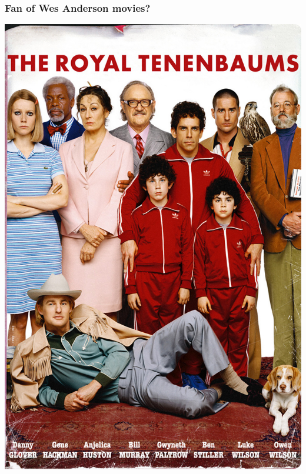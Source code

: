 \documentclass{beamer}\usepackage[]{graphicx}\usepackage[]{color}
\begin{document}
\begin{frame}[fragile]
\frametitle{Fan of Wes Anderson movies?}
\begin{center}
\includegraphics[scale=.12]{images/tenenbaums.png}
\end{center}
\end{frame}

\end{document}
